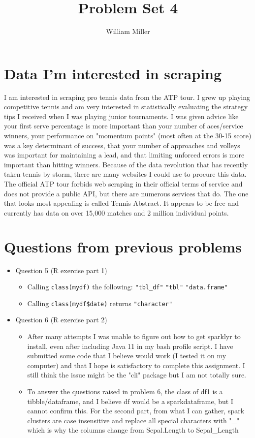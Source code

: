 \documentclass{article}
\title{Problem Set 4}
\author{William Miller}
\begin{document}
\maketitle


\section{Data I'm interested in scraping}
I am interested in scraping pro tennis data from the ATP tour. I grew up playing competitive tennis and am very interested in statistically evaluating the strategy tips I received when I was playing junior tournaments. I was given advice like your first serve percentage is more important than your number of aces/service winners, your performance on "momentum points" (most often at the 30-15 score) was a key determinant of success, that your number of approaches and volleys was important for maintaining a lead, and that limiting unforced errors is more important than hitting winners. 
Because of the data revolution that has recently taken tennis by storm, there are many websites I could use to procure this data. The official ATP tour forbids web scraping in their official terms of service and does not provide a public API, but there are numerous services that do. The one that looks most appealing is called Tennis Abstract. It appears to be free and currently has data on over 15,000 matches and 2 million individual points.

\section{Questions from previous problems}

\begin{itemize}
    \item Question 5 (R exercise part 1)
    \begin{itemize}
        \item Calling \texttt{class(mydf)} the following: \texttt{"tbl\_df"} \texttt{"tbl"} \texttt{"data.frame"}
        \item Calling \texttt{class(mydf\$date)} returns \texttt{"character"}
    \end{itemize}
    \item Question 6 (R exercise part 2)
    \begin{itemize}
        \item After many attempts I was unable to figure out how to get sparklyr to install, even after including Java 11 in my bash profile script. I have submitted some code that I believe would work (I tested it on my computer) and that I hope is satisfactory to complete this assignment. I still think the issue might be the "cli" package but I am not totally sure.  
        \item To answer the questions raised in problem 6, the class of df1 is a tibble/dataframe, and I believe df would be a sparkdataframe, but I cannot confirm this. For the second part, from what I can gather, spark clusters are case insensitive and replace all special characters with "\_" which is why the columns change from Sepal.Length to Sepal\_Length
    \end{itemize}
\end{itemize}
\end{document}
